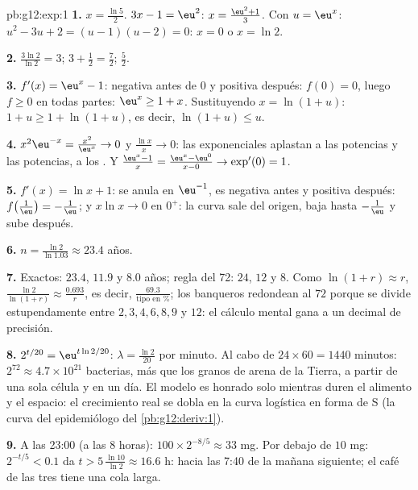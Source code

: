 \begin{solution}{pb:g12:exp:1}
\textbf{1.} $x = \frac{\ln 5}{2}$. \quad $3x - 1 = \eu^2$:
$x = \frac{\eu^2 + 1}{3}$. \quad Con $u = \eu^x$:
$u^2 - 3u + 2 = (u - 1)(u - 2) = 0$: $x = 0$ o $x = \ln 2$.

\textbf{2.} $\frac{3\ln 2}{\ln 2} = 3$; \quad $3 + \frac12 = \frac72$;
\quad $\frac52$.

\textbf{3.} $f'(x) = \eu^x - 1$: negativa antes de $0$ y positiva después:
 $f(0) = 0$, luego $f \geq 0$ en todas partes: $\eu^x \geq 1 + x$.
Sustituyendo $x = \ln(1 + u)$: $1 + u \geq 1 + \ln(1 + u)$, es decir,
$\ln(1 + u) \leq u$.

\textbf{4.} $x^2\eu^{-x} = \frac{x^2}{\eu^x} \to 0$ y
$\frac{\ln x}{x} \to 0$: las exponenciales aplastan a las potencias y las
potencias, a los . Y
$\frac{\eu^x - 1}{x} = \frac{\eu^x - \eu^0}{x - 0} \to \exp'(0) = 1$.

\textbf{5.} $f'(x) = \ln x + 1$: se anula en $\eu^{-1}$, es negativa antes
y positiva después:  $f\!\left(\frac1\eu\right) = -\frac1\eu$; y
$x \ln x \to 0$ en $0^+$: la curva sale del origen, baja hasta
$-\frac1\eu$ y sube después.

\textbf{6.} $n = \frac{\ln 2}{\ln 1.03} \approx 23.4$ años.

\textbf{7.} Exactos: $23.4$, $11.9$ y $8.0$ años; regla del 72: $24$, $12$
y $8$. Como $\ln(1+r) \approx r$,
$\frac{\ln 2}{\ln(1+r)} \approx \frac{0.693}{r}$, es decir,
$\frac{69.3}{\text{tipo en }\%}$; los banqueros redondean al $72$ porque se
divide estupendamente entre $2, 3, 4, 6, 8, 9$ y $12$: el cálculo mental
gana a un decimal de precisión.

\textbf{8.} $2^{t/20} = \eu^{t \ln 2 / 20}$: $\lambda = \frac{\ln 2}{20}$
por minuto. Al cabo de $24 \times 60 = 1440$ minutos:
$2^{72} \approx 4.7 \times 10^{21}$ bacterias, más que los granos de arena
de la Tierra, a partir de una sola célula y en un día. El modelo es honrado
solo mientras duren el alimento y el espacio: el crecimiento real se dobla
en la curva logística en forma de S (la curva del epidemiólogo del
\cref{pb:g12:deriv:1}).

\textbf{9.} A las 23:00 (a las $8$ horas):
$100 \times 2^{-8/5} \approx 33$ mg. Por debajo de $10$ mg:
$2^{-t/5} < 0.1$ da $t > 5\,\frac{\ln 10}{\ln 2} \approx 16.6$ h: hacia las
7:40 de la mañana siguiente; el café de las tres tiene una cola larga.


\end{solution}
